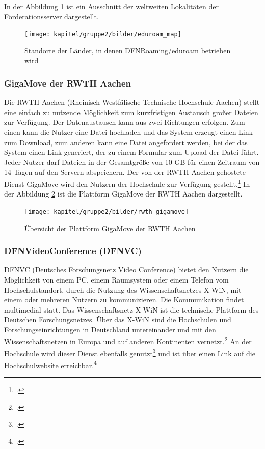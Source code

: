 In der Abbildung \ref{fig_map_eduroam} ist ein Ausschnitt der weltweiten Lokalitäten der Förderationsserver dargestellt.

\begin{figure}[h!]
	\centering
	\texttt{[image: kapitel/gruppe2/bilder/eduroam\_map]}
	\caption{Standorte der Länder, in denen DFNRoaming/eduroam betrieben wird\protect\footnotemark}
	\label{fig_map_eduroam}
\end{figure}

\subsubsection{GigaMove der RWTH Aachen}
\label{gigamove_rwth_aachen}
Die RWTH Aachen (Rheinisch-Westfälische Technische Hochschule Aachen) stellt eine einfach zu nutzende Möglichkeit zum kurzfristigen Austausch großer Dateien zur Verfügung. Der Datenaustausch kann aus zwei Richtungen erfolgen. Zum einen kann die Nutzer eine Datei hochladen und das System erzeugt einen Link zum Download, zum anderen kann eine Datei angefordert werden, bei der das System einen Link generiert, der zu einem Formular zum Upload der Datei führt. Jeder Nutzer darf Dateien in der Gesamtgröße von 10 GB für einen Zeitraum von 14 Tagen auf den Servern abspeichern. Der von der RWTH Aachen gehostete Dienst GigaMove wird den Nutzern der Hochschule zur Verfügung gestellt.\footcite{hsel_servicelinks_2015} In der Abbildung \ref{fig_rwth_gigamove} ist die Plattform GigaMove der RWTH Aachen dargestellt.

\begin{figure}[h]
	\centering
	\texttt{[image: kapitel/gruppe2/bilder/rwth\_gigamove]}
	\caption{Übersicht der Plattform GigaMove der RWTH Aachen \protect\footnotemark}
	\label{fig_rwth_gigamove}
\end{figure}

\subsubsection{DFNVideoConference (DFNVC)}
DFNVC (Deutsches Forschungsnetz Video Conference) bietet den Nutzern die Möglichkeit von einem 
PC, einem Raumsystem oder einem Telefon vom Hochschulstandort, durch die Nutzung des 
Wissenschaftsnetzes X-WiN, mit einem oder mehreren Nutzern zu kommunizieren. Die Kommunikation 
findet multimedial statt. Das Wissenschaftsnetz X-WiN ist die technische Plattform des Deutschen 
Forschungsnetzes. Über das X-WiN sind die Hochschulen und Forschungseinrichtungen in Deutschland 
untereinander und mit den Wissenschaftsnetzen in Europa und auf anderen Kontinenten 
vernetzt.\footcite[Vgl.][]{dfn_DFNVideoConference_2014} An der Hochschule wird dieser Dienst 
ebenfalls genutzt\footcite{hsel_shibboleth_auth_2015} und ist über einen Link auf die 
Hochschulwebsite erreichbar.\footcite{dfn_DFNVC_Webkonferenzen_2015}

